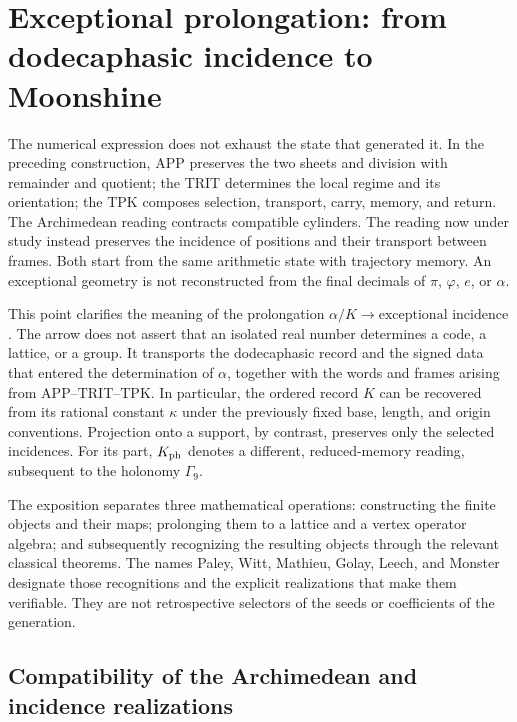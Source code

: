 \section{Exceptional prolongation: from dodecaphasic incidence to Moonshine}
\label{exc:seccion}

The numerical expression does not exhaust the state that generated it. In the
preceding construction, APP preserves the two sheets and division with
remainder and quotient; the TRIT determines the local regime and its orientation;
the TPK composes selection, transport, carry, memory, and return. The
Archimedean reading contracts compatible cylinders. The reading now
under study instead preserves the incidence of positions and their
transport between frames. Both start from the same arithmetic state with
trajectory memory. An exceptional geometry is not
reconstructed from the final decimals
of $\pi$, $\varphi$, $e$, or $\alpha$.

This point clarifies the meaning of the prolongation
$\alpha/K\longrightarrow\text{exceptional incidence}$. The arrow does not
assert that an isolated real number determines a code, a lattice, or a
group. It transports the dodecaphasic record and the signed data that
entered the determination of $\alpha$, together with the words and
frames arising from APP--TRIT--TPK. In particular, the ordered record
$K$ can be recovered from its rational constant $\kappa$ under the
previously fixed base, length, and origin conventions. Projection onto a
support, by contrast, preserves only the selected incidences.
For its part, $K_{\rm ph}$
denotes a different, reduced-memory reading, subsequent to the holonomy
$\Gamma_9$.

The exposition separates three mathematical operations: constructing the
finite objects and their maps; prolonging them to a lattice and a vertex
operator algebra; and subsequently recognizing the resulting objects through
the relevant classical theorems. The names Paley, Witt, Mathieu, Golay, Leech, and
Monster designate those recognitions and the explicit realizations
that make them verifiable. They are not retrospective selectors of the
seeds or coefficients of the generation.




\subsection{Compatibility of the Archimedean and incidence realizations}
\label{exc:doble-lectura}

